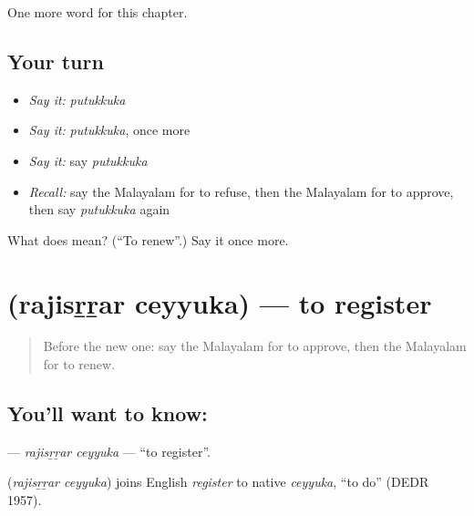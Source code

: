 \begin{grammarlens}[title={What you've built}]
One more word for this chapter.
\end{grammarlens}

\subsection*{Your turn}
\begin{itemize}
\raggedright
  \item \emph{Say it:} \emph{putukkuka}
  \item \emph{Say it:} \emph{putukkuka}, once more
  \item \emph{Say it:} say \emph{putukkuka}
  \item \emph{Recall:} say the Malayalam for to refuse, then the Malayalam for to approve, then say \emph{putukkuka} again
\end{itemize}

\begin{tcolorbox}[breakable,colback=teal!4,colframe=teal!35!black,title={Before you move on}]
What does  mean? (\textquotedblleft{}To renew\textquotedblright{}.) Say it once more.
\end{tcolorbox}
\section[\texorpdfstring{\ml{രജിസ്റ്റർ} \ml{ചെയ്യുക} (rajisṟṟar ceyyuka)}{രജിസ്റ്റർ ചെയ്യുക (rajisṟṟar ceyyuka)}]{  (rajisṟṟar ceyyuka) — to register}

\label{lesson:ML-C268-rajisrrar-ceyyuka}



\begin{quote}
Before the new one: say the Malayalam for to approve, then the Malayalam for to renew.
\end{quote}

\subsection*{You'll want to know:  }
\textbf{ } — \emph{rajisṟṟar ceyyuka} — \textquotedblleft{}to register\textquotedblright{}.

\begin{cousinweb}
\textbf{ } (\emph{rajisṟṟar ceyyuka}) joins English \emph{register} to native \emph{ceyyuka}, \textquotedblleft{}to do\textquotedblright{} (DEDR 1957).
\end{cousinweb}

